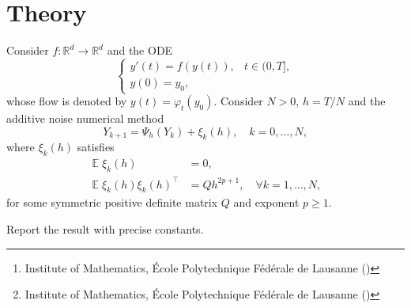 \documentclass{siamart1116}
\title{{\TheTitle}}
\author{Assyr Abdulle\thanks{Institute of Mathematics, \'Ecole Polytechnique F\'ed\'erale de Lausanne (\email{assyr.abdulle@epfl.ch})}
		\and
		Giacomo Garegnani\thanks{Institute of Mathematics, \'Ecole Polytechnique F\'ed\'erale de Lausanne (\email{giacomo.garegnani@epfl.ch})}}
\numberwithin{theorem}{section}
\renewcommand{\phi}{\varphi}
\newcommand{\R}{\mathbb{R}}
\newcommand{\E}{\operatorname{\mathbb{E}}}
\begin{document}
\maketitle	

\section{Theory} Consider $f \colon \R^d \to \R^d$ and the ODE
\begin{equation}\label{eq:ODE}
	\begin{cases}
	y'(t) = f(y(t)), & t \in (0, T],\\
    y(0) = y_0,
	\end{cases}
\end{equation}
whose flow is denoted by $y(t) = \phi_t(y_0)$. Consider $N > 0$, $h = T / N$ and the additive noise numerical method
\begin{equation}\label{eq:AdditiveNoise}
	Y_{k+1} = \Psi_h(Y_k) + \xi_k(h), \quad k = 0, \ldots, N,
\end{equation}
where $\xi_k(h)$ satisfies
\begin{align}\label{eq:AdditiveNoise_Assumption}
	\E \xi_k(h) &= 0,  \\
	\E \xi_k(h)\xi_k(h)^\top &= Q h^{2p+1},  \quad \forall k = 1, \ldots, N,
\end{align}
for some symmetric positive definite matrix $Q$ and exponent $p \geq 1$. 

\begin{theorem} Report the result with precise constants. 
\end{theorem}
\end{document}
